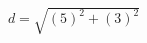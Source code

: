 \documentclass[preview]{standalone}
\begin{document}
\begin{align*}
d = \sqrt{(5)^2 + (3)^2}
\end{align*}
\end{document}
